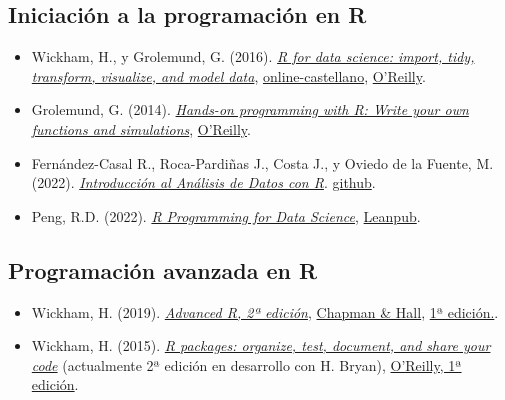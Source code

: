 \documentclass[
]{book}
\theoremstyle{break}
\theoremstyle{nonumberplain}
\begin{document}
\hypertarget{iniciaciuxf3n-a-la-programaciuxf3n-en-r}{%
\subsection*{Iniciación a la programación en R}\label{iniciaciuxf3n-a-la-programaciuxf3n-en-r}}

\begin{itemize}
\item
  Wickham, H., y Grolemund, G. (2016). \emph{\href{http://r4ds.had.co.nz}{R for data science: import, tidy, transform, visualize, and model data}}, \href{https://es.r4ds.hadley.nz}{online-castellano}, \href{http://shop.oreilly.com/product/0636920034407.do}{O'Reilly}.
\item
  Grolemund, G. (2014). \emph{\href{https://rstudio-education.github.io/hopr}{Hands-on programming with R: Write your own functions and simulations}}, \href{http://shop.oreilly.com/product/0636920028574.do}{O'Reilly}.
\item
  Fernández-Casal R., Roca-Pardiñas J., Costa J., y Oviedo de la Fuente, M. (2022). \emph{\href{https://rubenfcasal.github.io/intror}{Introducción al Análisis de Datos con R}}. \href{https://github.com/rubenfcasal/intror}{github}.
\item
  Peng, R.D. (2022). \emph{\href{https://bookdown.org/rdpeng/rprogdatascience}{R Programming for Data Science}}, \href{https://leanpub.com/rprogramming}{Leanpub}.
\end{itemize}

\hypertarget{programaciuxf3n-avanzada-en-r}{%
\subsection*{Programación avanzada en R}\label{programaciuxf3n-avanzada-en-r}}

\begin{itemize}
\item
  Wickham, H. (2019). \emph{\href{https://adv-r.hadley.nz/}{Advanced R, 2ª edición}}, \href{https://www.amazon.com/dp/0815384572}{Chapman \& Hall}, \href{http://adv-r.had.co.nz/}{1ª edición.}.
\item
  Wickham, H. (2015). \emph{\href{http://r-pkgs.had.co.nz/}{R packages: organize, test, document, and share your code}} (actualmente 2ª edición en desarrollo con H. Bryan), \href{http://shop.oreilly.com/product/0636920034421.do}{O'Reilly, 1ª edición}.
\end{itemize}
\end{document}
